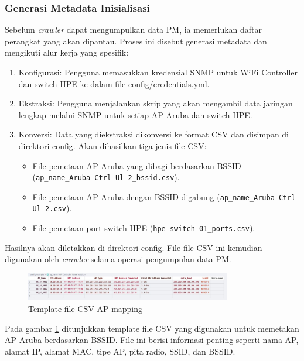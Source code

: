 \subsubsection{Generasi Metadata Inisialisasi}

Sebelum \textit{crawler} dapat mengumpulkan data PM, ia memerlukan daftar perangkat yang akan dipantau. Proses ini disebut generasi metadata dan mengikuti alur kerja yang spesifik:

\begin{enumerate}
    \item Konfigurasi: Pengguna memasukkan kredensial SNMP untuk WiFi Controller dan switch HPE ke dalam file config/credentials.yml.
    \item Ekstraksi: Pengguna menjalankan skrip yang akan mengambil data jaringan lengkap melalui SNMP untuk setiap AP Aruba dan switch HPE.
    \item Konversi: Data yang diekstraksi dikonversi ke format CSV dan disimpan di direktori config. Akan dihasilkan tiga jenis file CSV:
    \begin{itemize}
        \item File pemetaan AP Aruba yang dibagi berdasarkan BSSID (\texttt{ap\_name\_Aruba-Ctrl-Ul-2\_bssid.csv}).
        \item File pemetaan AP Aruba dengan BSSID digabung (\texttt{ap\_name\_Aruba-Ctrl-Ul-2.csv}).
        \item File pemetaan port switch HPE (\texttt{hpe-switch-01\_ports.csv}).
    \end{itemize}
\end{enumerate}

Hasilnya akan diletakkan di direktori config. File-file CSV ini kemudian digunakan oleh \textit{crawler} selama operasi pengumpulan data PM.

\begin{figure}[htbp]
    \centering
    \includegraphics[width=0.8\textwidth]{assets/pics/config_example.png}
    \caption{Template file CSV AP mapping}
    \label{fig:config_example}
\end{figure}

Pada gambar \ref{fig:config_example} ditunjukkan template file CSV yang digunakan untuk memetakan AP Aruba berdasarkan BSSID. File ini berisi informasi penting seperti nama AP, alamat IP, alamat MAC, tipe AP, pita radio, SSID, dan BSSID.


